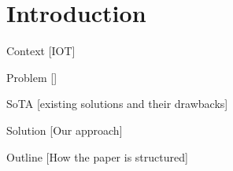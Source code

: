 \section{Introduction}
Context [IOT]


Problem []


SoTA [existing solutions and their drawbacks]


Solution [Our approach]


Outline [How the paper is structured]
